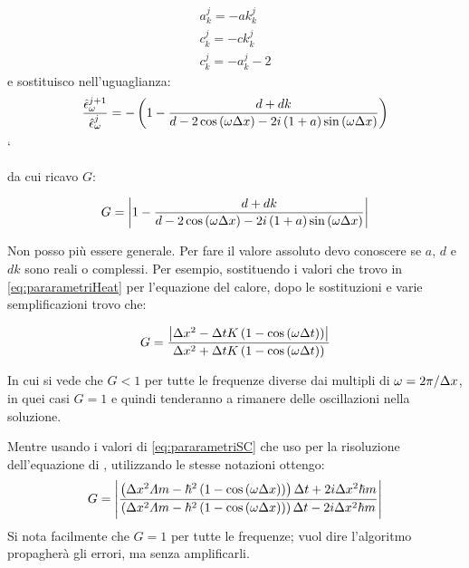 \begin{equation*}
  \begin{array}{l}
    a_k^j = - ak_k^j \\
    c_k^j = - ck_k^j \\
    c_k^j = -a_k^j -2
  \end{array}
\end{equation*}
e sostituisco nell'uguaglianza:
\begin{equation}
  \frac{\hat{\epsilon}^{j+1}_\o}{\hat{\epsilon}^j_\o}= -\lrt{1 -
    \frac{d+dk}{d-2 \cos\lrt{\o \Delta x}-2 i\lrt{1+a}\sin\lrt{\o \Delta x}}}
\end{equation}`

da cui ricavo $G$:

\begin{equation}
  G = \lr||{1 -
    \frac{d+dk}{d-2 \cos\lrt{\o \Delta x}-2 i\lrt{1+a}\sin\lrt{\o \Delta x}}}
\end{equation}

Non posso pi\`u essere generale. Per fare il valore assoluto devo conoscere se $a$, $d$ e $dk$ sono reali o complessi.
Per esempio, sostituendo i valori che trovo in \eqref{eq:pararametriHeat} per l'equazione del calore, dopo le sostituzioni e varie semplificazioni trovo che:

\begin{equation}
  G = \frac{\lr||{\Delta x^2 - \Delta t K \lrt{1-\cos\lrt{\o \Delta t}}}}{\Delta x^2 + \Delta t K \lrt{1-\cos\lrt{\o \Delta t}}}
\end{equation}

In cui si vede che $G<1$ per tutte le frequenze diverse dai multipli di $\o = 2\pi/\Delta x$, in quei casi $G=1$ e quindi tenderanno a rimanere delle oscillazioni nella soluzione.

Mentre usando i valori di \eqref{eq:pararametriSC} che uso per la risoluzione dell'equazione di \Schrodinger, utilizzando le stesse notazioni ottengo:
\begin{equation}
  G = \lr||{\frac{\lrt{\Delta x^2 \varLambda m - \hbar^2\lrt{1-\cos\lrt{\o \Delta x}}}\Delta t+2 i \Delta x^2 \hbar m}
    {\lrt{\Delta x^2 \varLambda m - \hbar^2\lrt{1-\cos\lrt{\o \Delta x}}}\Delta t-2 i \Delta x^2 \hbar m}}
\end{equation}
Si nota facilmente che $G=1$ per tutte le frequenze; vuol dire l'algoritmo propagher\`a gli errori, ma senza amplificarli.
